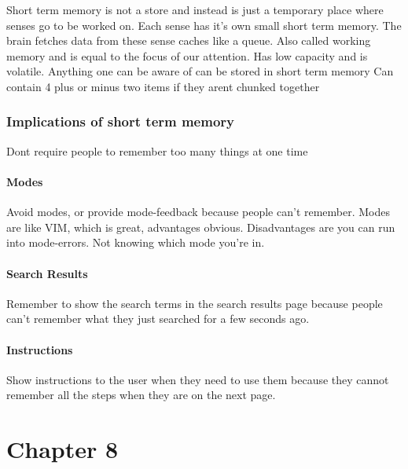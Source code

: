 \documentclass[11pt,]{article}
\let\oldparagraph\paragraph
\renewcommand{\paragraph}[1]{\oldparagraph{#1}\mbox{}}
\begin{document}
Short term memory is not a store and instead is just a temporary place
where senses go to be worked on. Each sense has it's own small short
term memory. The brain fetches data from these sense caches like a
queue. Also called working memory and is equal to the focus of our
attention. Has low capacity and is volatile. Anything one can be aware
of can be stored in short term memory Can contain 4 plus or minus two
items if they arent chunked together

\hypertarget{implications-of-short-term-memory}{%
\subsubsection{Implications of short term
memory}\label{implications-of-short-term-memory}}

Dont require people to remember too many things at one time

\hypertarget{modes}{%
\paragraph{Modes}\label{modes}}

Avoid modes, or provide mode-feedback because people can't remember.
Modes are like VIM, which is great, advantages obvious. Disadvantages
are you can run into mode-errors. Not knowing which mode you're in.

\hypertarget{search-results}{%
\paragraph{Search Results}\label{search-results}}

Remember to show the search terms in the search results page because
people can't remember what they just searched for a few seconds ago.

\hypertarget{instructions}{%
\paragraph{Instructions}\label{instructions}}

Show instructions to the user when they need to use them because they
cannot remember all the steps when they are on the next page.

\hypertarget{chapter-8}{%
\section{Chapter 8}\label{chapter-8}}
\end{document}
